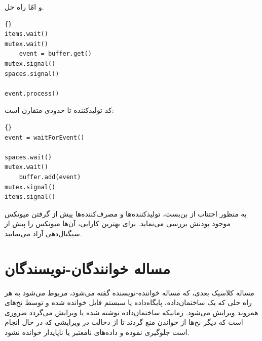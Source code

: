 \documentclass{book}
\begin{document}
    و امّا راه حل. 

\begin{latin}
\begin{latin}
\begin{lstlisting}[title=\rl{راه حل  بافر محدود  مصرف‌کننده}]{}
items.wait()
mutex.wait()
    event = buffer.get()
mutex.signal()
spaces.signal()

event.process()
\end{lstlisting}
\end{latin}
\end{latin}

    کد تولیدکننده  تا حدودی متقارن است: 

\begin{latin}
\begin{latin}
\begin{lstlisting}[title=\rl{راه حل  بافر محدود تولیدکننده}]{}
event = waitForEvent()

spaces.wait()
mutex.wait()
    buffer.add(event)
mutex.signal()
items.signal()
\end{lstlisting}
\end{latin}
\end{latin}

    به منظور اجتناب از بن‌بست، تولیدکننده‌ها و مصرف‌کننده‌ها پیش از گرفتن میوتکس موجود بودنش بررسی می‌نماید. 
    برای بهترین کارایی، آن‌ها میوتکس را پیش از سیگنال‌دهی آزاد می‌نمایند. 


\section{مساله خوانندگان-نویسندگان}

    مساله کلاسیک بعدی، که مساله خواننده-نویسنده گفته می‌شود، مربوط می‌شود به هر راه حلی که یک ساختمان‌داده، پایگاه‌داده یا سیستم فایل 
    خوانده شده و توسط نخ‌های همروند ویرایش می‌شود. زمانیکه ساختمان‌داده نوشته شده یا ویرایش می‌گردد ضروری است که دیگر نخ‌ها
    از خواندن منع گردند تا از دخالت در ویرایشی که در حال انجام است جلوگیری نموده و داده‌های نامعتبر یا ناپایدار خوانده نشود. 
\end{document}
